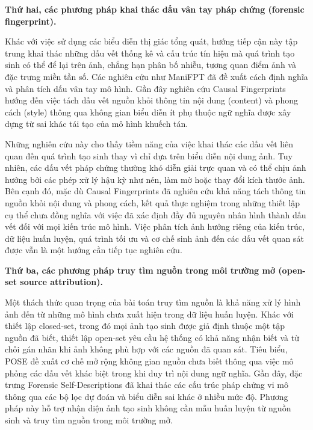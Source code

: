 \documentclass[12pt]{report}
\begin{document}
\medskip
\noindent\textbf{Thứ hai, các phương pháp khai thác dấu vân tay pháp chứng (forensic fingerprint).}

Khác với việc sử dụng các biểu diễn thị giác tổng quát, hướng tiếp cận này tập trung khai thác những dấu vết thống kê và cấu trúc tín hiệu mà quá trình tạo sinh có thể để lại trên ảnh, chẳng hạn phân bố nhiễu, tương quan điểm ảnh và đặc trưng miền tần số. Các nghiên cứu như ManiFPT \cite{song2024manifpt} đã đề xuất cách định nghĩa và phân tích dấu vân tay mô hình. Gần đây nghiên cứu Causal Fingerprints \cite{xu2025causal} hướng đến việc tách dấu vết nguồn khỏi thông tin nội dung (content) và phong cách (style) thông qua không gian biểu diễn ít phụ thuộc ngữ nghĩa được xây dựng từ sai khác tái tạo của mô hình khuếch tán.

Những nghiên cứu này cho thấy tiềm năng của việc khai thác các dấu vết liên quan đến quá trình tạo sinh thay vì chỉ dựa trên biểu diễn nội dung ảnh. Tuy nhiên, các dấu vết pháp chứng thường khó diễn giải trực quan và có thể chịu ảnh hưởng bởi các phép xử lý hậu kỳ như nén, làm mờ hoặc thay đổi kích thước ảnh. Bên cạnh đó, mặc dù Causal Fingerprints đã nghiên cứu khả năng tách thông tin nguồn khỏi nội dung và phong cách, kết quả thực nghiệm trong những thiết lập cụ thể chưa đồng nghĩa với việc đã xác định đầy đủ nguyên nhân hình thành dấu vết đối với mọi kiến trúc mô hình. Việc phân tích ảnh hưởng riêng của kiến trúc, dữ liệu huấn luyện, quá trình tối ưu và cơ chế sinh ảnh đến các dấu vết quan sát được vẫn là một hướng cần tiếp tục nghiên cứu.

\medskip
\noindent\textbf{Thứ ba, các phương pháp truy tìm nguồn trong môi trường mở (open-set source attribution).}

Một thách thức quan trọng của bài toán truy tìm nguồn là khả năng xử lý hình ảnh đến từ những mô hình chưa xuất hiện trong dữ liệu huấn luyện. Khác với thiết lập closed-set, trong đó mọi ảnh tạo sinh được giả định thuộc một tập nguồn đã biết, thiết lập open-set yêu cầu hệ thống có khả năng nhận biết và từ chối gán nhãn khi ảnh không phù hợp với các nguồn đã quan sát. Tiêu biểu, POSE \cite{yang2023progressive} đề xuất cơ chế mở rộng không gian nguồn chưa biết thông qua việc mô phỏng các dấu vết khác biệt trong khi duy trì nội dung ngữ nghĩa. Gần đây, đặc trưng Forensic Self-Descriptions \cite{Nguyen_2025_CVPR} đã khai thác các cấu trúc pháp chứng vi mô thông qua các bộ lọc dự đoán và biểu diễn sai khác ở nhiều mức độ. Phương pháp này hỗ trợ nhận diện ảnh tạo sinh không cần mẫu huấn luyện từ nguồn sinh và truy tìm nguồn trong môi trường mở.
\end{document}
